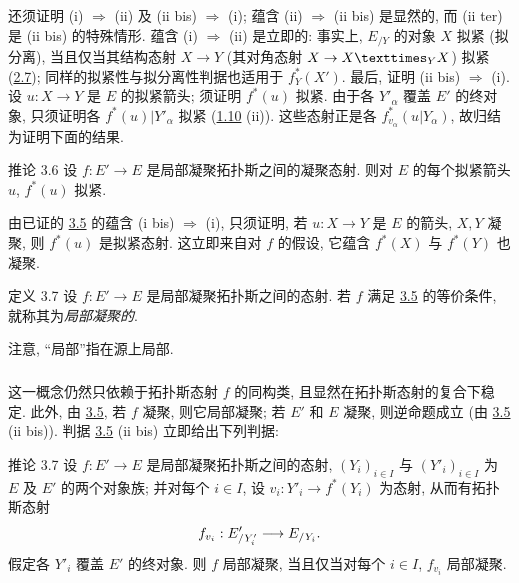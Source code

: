 还须\pageoriginale{}证明 (i) $\Rightarrow$ (ii)
及 (ii bis) $\Rightarrow$ (i);
蕴含 (ii) $\Rightarrow$ (ii bis) 是显然的,
而 (ii ter) 是 (ii bis) 的特殊情形.
蕴含 (i) $\Rightarrow$ (ii) 是立即的:
事实上, $E_{/Y}$ 的对象 $X$ 拟紧 (\resp 拟分离),
当且仅当其结构态射 $X\to Y$
(\resp 其对角态射 $X\to\fprod{X}{X}{Y}$) 拟紧
(\hyperref[VI.cor2.7]{2.7});
同样的拟紧性与拟分离性判据也适用于 $f^{\ast}_Y(X')$.
最后, 证明 (ii bis) $\Rightarrow$ (i).
设 $u:X\to Y$ 是 $E$ 的拟紧箭头;
须证明 $f^{\ast}(u)$ 拟紧.
由于各 $Y'_{\alpha}$ 覆盖 $E'$ 的终对象,
只须证明各 $f^{\ast}(u)|Y'_{\alpha}$ 拟紧
(\hyperref[VI.prop1.10]{1.10} (ii)).
这些态射正是各 $f^{\ast}_{v_\alpha}(u|Y_{\alpha})$,
故归结为证明下面的结果.

\begin{enonce*}{推论 3.6}
设 $f:E'\to E$ 是局部凝聚拓扑斯之间的凝聚态射.
则对 $E$ 的每个拟紧箭头 $u$, $f^{\ast}(u)$ 拟紧.
\end{enonce*}

由已证的 \hyperref[VI.prop3.5]{3.5} 的蕴含
(i bis) $\Rightarrow$ (i),
只须证明, 若 $u:X\to Y$ 是 $E$ 的箭头, $X,Y$ 凝聚,
则 $f^{\ast}(u)$ 是拟紧态射.
这立即来自对 $f$ 的假设,
它蕴含 $f^{\ast}(X)$ 与 $f^{\ast}(Y)$ 也凝聚.

\begin{enonce*}{定义 3.7}
设 $f:E'\to E$\pageoriginale{} 是局部凝聚拓扑斯之间的态射.
若 $f$ 满足 \hyperref[VI.prop3.5]{3.5} 的等价条件,
就称其为\emph{局部凝聚的}.
\end{enonce*}

注意, “局部”指在源上局部.

\setcounter{subsection}{7}
\setcounter{subsubsection}{0}
\subsubsection{}
这一概念仍然只依赖于拓扑斯态射 $f$ 的同构类,
且显然在拓扑斯态射的复合下稳定.
此外, 由 \hyperref[VI.prop3.5]{3.5},
若 $f$ 凝聚, 则它局部凝聚;
若 $E'$ 和 $E$ 凝聚, 则逆命题成立
(由 \hyperref[VI.prop3.5]{3.5} (ii bis)).
判据 \hyperref[VI.prop3.5]{3.5} (ii bis) 立即给出下列判据:

\begin{enonce*}{推论 3.7}
设 $f:E'\to E$ 是局部凝聚拓扑斯之间的态射,
$(Y_i)_{i\in I}$ 与 $({Y'}_i)_{i\in I}$
为 $E$ 及 $E'$ 的两个对象族;
并对每个 $i\in I$, 设 $v_i:Y'_i\to f^{\ast}(Y_i)$ 为态射,
从而有拓扑斯态射
$$
f_{v_i}:E'_{/Y'_i}\to E_{/Y_i}{\quoi}.
$$
假定各 ${Y'}_i$ 覆盖 $E'$ 的终对象.
则 $f$ 局部凝聚,
当且仅当对每个 $i\in I$, $f_{v_i}$ 局部凝聚.
\end{enonce*}

